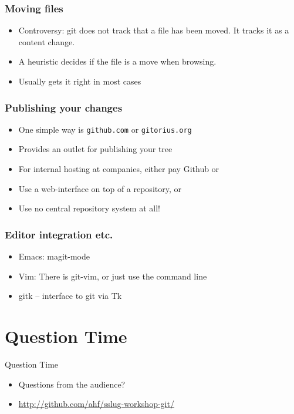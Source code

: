 \documentclass[xcolor=pdftex,dvipsnames]{beamer}
\begin{document}
\begin{frame}
  \frametitle{Moving files}
  \begin{itemize}
  \item Controversy: git does not track that a file has been moved. It
    tracks it as a content change.
  \item A heuristic decides if the file is a move when browsing.
  \item Usually gets it right in most cases
  \end{itemize}
\end{frame}

\begin{frame}
  \frametitle{Publishing your changes}
  \begin{itemize}
  \item One simple way is \texttt{github.com} or \texttt{gitorius.org}
  \item Provides an outlet for publishing your tree
  \item For internal hosting at companies, either pay Github or
  \item Use a web-interface on top of a repository, or
  \item Use no central repository system at all!
  \end{itemize}
\end{frame}

\begin{frame}
  \frametitle{Editor integration etc.}
  \begin{itemize}
  \item Emacs: magit-mode
  \item Vim: There is git-vim, or just use the command line
  \item gitk -- interface to git via Tk
  \end{itemize}
\end{frame}


\section{Question Time}
\begin{frame}{Question Time}
    \begin{itemize}
        \item Questions from the audience?
        \item \url{http://github.com/ahf/sslug-workshop-git/}
    \end{itemize}
\end{frame}
\end{document}

